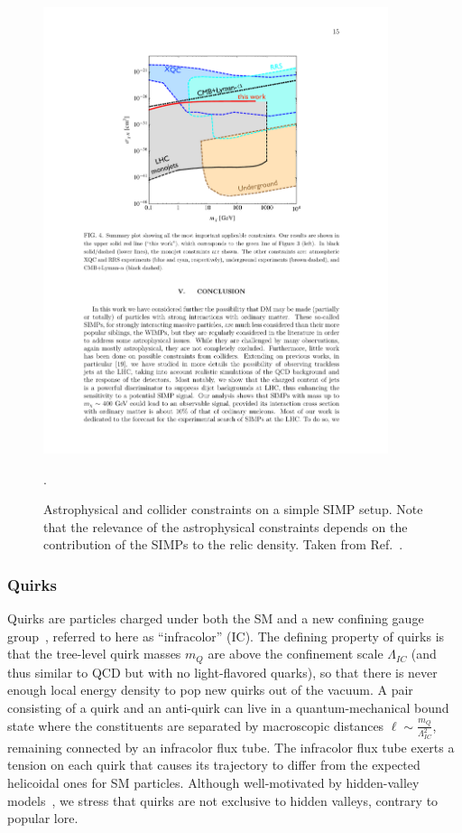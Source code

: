{\begin{figure}[t]
\centering
\includegraphics[width=0.9\textwidth]{plots/simps_constraints.pdf}
\caption{Astrophysical and collider constraints on a simple SIMP setup. Note that the relevance of the astrophysical constraints depends on the contribution of the SIMPs to the relic density. Taken from Ref.~\cite{Daci:2015hca}.}
  \label{fig:simps}.
\end{figure}

\subsubsection*{Quirks}

Quirks are particles charged under both the SM and a new confining gauge group~\cite{Kang:2008ea}, referred to here as ``infracolor'' (IC). The defining property of quirks is that the tree-level quirk masses $m_Q$ are above the confinement scale $\Lambda_{IC}$ (and thus similar to QCD but with no light-flavored quarks), so that there is never enough local energy density to pop new quirks out of the vacuum. A pair consisting of a quirk and an anti-quirk can live in a quantum-mechanical bound state where the constituents are separated by macroscopic distances $\ell \sim \frac{m_Q}{\Lambda_{IC}^2}$, remaining connected by an infracolor flux tube. The infracolor flux tube exerts a tension on each quirk that causes its trajectory to differ from the expected helicoidal ones for SM particles. Although well-motivated by hidden-valley models~\cite{Strassler:2006im}, we stress that quirks are not exclusive to hidden valleys, contrary to popular lore.

}
